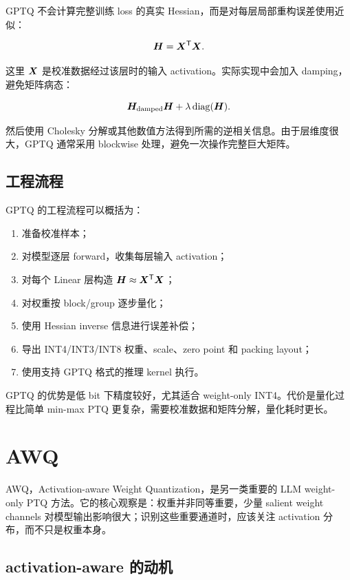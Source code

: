 GPTQ 不会计算完整训练 loss 的真实 Hessian，而是对每层局部重构误差使用近似：

\[
\bm{H}=\bm{X}^{\mathsf{T}}\bm{X}.
\]

这里 $\bm{X}$ 是校准数据经过该层时的输入 activation。实际实现中会加入 damping，避免矩阵病态：

\[
\bm{H}_{\mathrm{damped}}
\bm{H}
+
\lambda \operatorname{diag}(\bm{H}).
\]

然后使用 Cholesky 分解或其他数值方法得到所需的逆相关信息。由于层维度很大，GPTQ 通常采用 blockwise 处理，避免一次操作完整巨大矩阵。

\subsection{工程流程}
\label{subsec:gptq-engineering-flow}

GPTQ 的工程流程可以概括为：

\begin{enumerate}
\item 准备校准样本；
\item 对模型逐层 forward，收集每层输入 activation；
\item 对每个 Linear 层构造 $\bm{H}\approx \bm{X}^{\mathsf{T}}\bm{X}$；
\item 对权重按 block/group 逐步量化；
\item 使用 Hessian inverse 信息进行误差补偿；
\item 导出 INT4/INT3/INT8 权重、scale、zero point 和 packing layout；
\item 使用支持 GPTQ 格式的推理 kernel 执行。
\end{enumerate}

GPTQ 的优势是低 bit 下精度较好，尤其适合 weight-only INT4。代价是量化过程比简单 min-max PTQ 更复杂，需要校准数据和矩阵分解，量化耗时更长。

\section{AWQ}
\label{sec:awq}

AWQ，Activation-aware Weight Quantization，是另一类重要的 LLM weight-only PTQ 方法。它的核心观察是：权重并非同等重要，少量 salient weight channels 对模型输出影响很大；识别这些重要通道时，应该关注 activation 分布，而不只是权重本身。

\subsection{activation-aware 的动机}
\label{subsec:awq-activation-aware-motivation}

